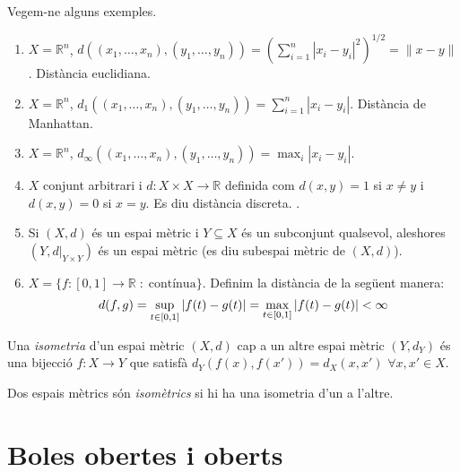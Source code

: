 \documentclass[../main.tex]{subfiles}
\begin{document}
\begin{ej}
Vegem-ne alguns exemples.
\begin{enumerate}[(1)]
    \item $X=\mathbb{R}^n$, $d((x_1,\ldots,x_n),(y_1,\ldots,y_n)) = \left(\sum_{i=1}^n|x_i-y_i|^2\right)^{1/2} = \|x-y\|$. Distància euclidiana.
    \item $X=\mathbb{R}^n$, $d_1((x_1,\ldots,x_n),(y_1,\ldots,y_n)) = \sum_{i=1}^n |x_i-y_i|$. Distància de Manhattan.
    \item $X = \mathbb{R}^n$, $d_\infty((x_1,\ldots,x_n),(y_1,\ldots,y_n)) = \max_i|x_i-y_i|$.
    \item $X$ conjunt arbitrari i $d:X\times X\rightarrow \mathbb{R}$ definida com $d(x,y) = 1$ si $x\not=y$ i $d(x,y) = 0$ si $x= y$. Es diu distància discreta. .
    \item Si $(X,d)$ és un espai mètric i $Y\subseteq X$ és un subconjunt qualsevol, aleshores $(Y,d|_{Y\times Y})$ és un espai mètric (es diu subespai mètric de $(X,d)$).
    \item $X=\{f:[0,1]\rightarrow \mathbb{R}\;:\;\text{contínua}\}$. Definim la distància de la següent manera:
    \begin{equation}
        \notag
        d(f,g) = \sup_{t\in[0,1]}|f(t)-g(t)| = \max_{t\in[0,1]}|f(t)-g(t)|<\infty
    \end{equation}
\end{enumerate}
\end{ej}

\begin{defi}
[Isometria]\label{def:isometria} Una \textit{isometria} d'un espai mètric $(X,d)$ cap a un altre espai mètric $(Y,d_Y)$ és una bijecció $f:X\rightarrow Y$ que satisfà $d_Y(f(x),f(x')) = d_X(x,x')$ $\forall x,x'\in X$.
\end{defi}

\begin{defi}
\label{def:espaisisometrics} Dos espais mètrics són \textit{isomètrics} si hi ha una isometria d'un a l'altre.
\end{defi}







\section{Boles obertes i oberts}
\end{document}
